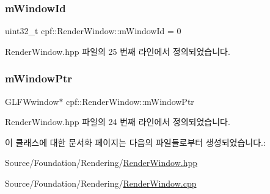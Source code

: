 \subsubsection{\texorpdfstring{m\+Window\+Id}{mWindowId}}
{\footnotesize\ttfamily uint32\+\_\+t cpf\+::\+Render\+Window\+::m\+Window\+Id = 0\hspace{0.3cm}{\ttfamily [private]}}



Render\+Window.\+hpp 파일의 25 번째 라인에서 정의되었습니다.

\mbox{\label{classcpf_1_1_render_window_a871b4de6be0b9fa29b9394e38c395a04}} 
\subsubsection{\texorpdfstring{m\+Window\+Ptr}{mWindowPtr}}
{\footnotesize\ttfamily G\+L\+F\+Wwindow$\ast$ cpf\+::\+Render\+Window\+::m\+Window\+Ptr\hspace{0.3cm}{\ttfamily [private]}}



Render\+Window.\+hpp 파일의 24 번째 라인에서 정의되었습니다.



이 클래스에 대한 문서화 페이지는 다음의 파일들로부터 생성되었습니다.\+:\begin{DoxyCompactItemize}
\item 
Source/\+Foundation/\+Rendering/\hyperlink{_render_window_8hpp}{Render\+Window.\+hpp}\item 
Source/\+Foundation/\+Rendering/\hyperlink{_render_window_8cpp}{Render\+Window.\+cpp}\end{DoxyCompactItemize}
